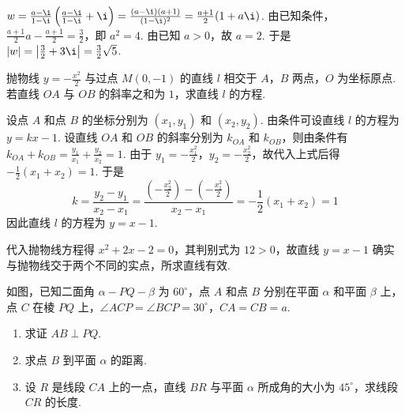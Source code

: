 \begin{solution}
\(w = \frac{a - \i}{1 - \i}\left(\frac{a - \i}{1 - \i} + \i\right) = \frac{(a - \i)(a + 1)}{(1 - \i)^2} = \frac{a + 1}{2}(1 + a\i)\). 由已知条件，\(\frac{a + 1}{2}a - \frac{a + 1}{2} = \frac{3}{2}\)，即 \(a^2 = 4\). 由已知 \(a > 0\)，故 \(a = 2\). 于是 \(|w| = \left|\frac{3}{2} + 3\i\right| = \frac{3}{2}\sqrt{5}\).
\end{solution}

\begin{problem}
抛物线 \(y = -\frac{x^2}{2}\) 与过点 \(M(0,-1)\) 的直线 \(l\) 相交于 \(A\)，\(B\) 两点，\(O\) 为坐标原点. 若直线 \(OA\) 与 \(OB\) 的斜率之和为 \(1\)，求直线 \(l\) 的方程.
\end{problem}

\begin{solution}
设点 \(A\) 和点 \(B\) 的坐标分别为 \((x_1,y_1)\) 和 \((x_2,y_2)\). 由条件可设直线 \(l\) 的方程为 \(y = kx - 1\). 设直线 \(OA\) 和 \(OB\) 的斜率分别为 \(k_{OA}\) 和 \(k_{OB}\)，则由条件有
\(k_{OA} + k_{OB} = \frac{y_1}{x_1} + \frac{y_2}{x_2} = 1\).
由于 \(y_1 = -\frac{x_1^2}{2}\)，\(y_2 = -\frac{x_2^2}{2}\)，故代入上式后得 \(-\frac{1}{2}(x_1 + x_2) = 1\). 于是
\[
 k = \frac{y_2 - y_1}{x_2 - x_1} = \frac{\left(-\frac{x_2^2}{2}\right) - \left(-\frac{x_1^2}{2}\right)}{x_2 - x_1} = -\frac{1}{2}(x_1 + x_2) = 1
\]
因此直线 \(l\) 的方程为 \(y = x - 1\).

代入抛物线方程得 \(x^2+2x-2=0\)，其判别式为 \(12>0\)，故直线 \(y=x-1\) 确实与抛物线交于两个不同的实点，所求直线有效.

\end{solution}

\begin{problem}
如图，已知二面角 \(\alpha - PQ - \beta\) 为 \(60^{\circ}\)，点 \(A\) 和点 \(B\) 分别在平面 \(\alpha\) 和平面 \(\beta\) 上，点 \(C\) 在棱 \(PQ\) 上，\(\angle ACP = \angle BCP = 30^{\circ}\)，\(CA = CB = a\).

\begin{enumerate}
\item 求证 \(AB \perp PQ\).
\item 求点 \(B\) 到平面 \(\alpha\) 的距离.
\item 设 \(R\) 是线段 \(CA\) 上的一点，直线 \(BR\) 与平面 \(\alpha\) 所成角的大小为 \(45^{\circ}\)，求线段 \(CR\) 的长度.
\end{enumerate}

\end{problem}

